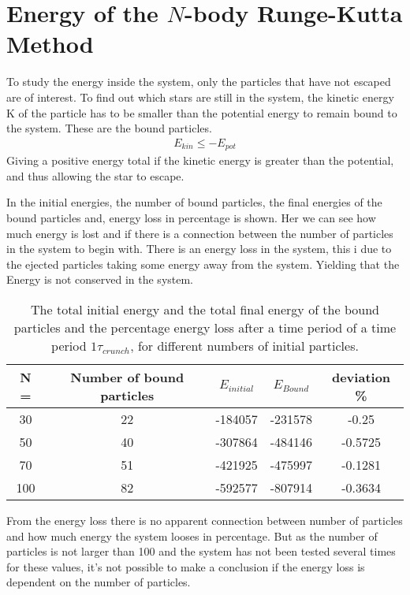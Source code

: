 \section{Energy of the $N$-body Runge-Kutta Method}
\label{sec:EnergyRK4}


To study the energy inside the system, only the particles that have not escaped are of interest. To find out which stars are still in the system, the kinetic energy K of the particle has to be smaller than the potential energy to remain bound to the system. These are the bound particles.   
\begin{align}
  E_{kin} \leqslant -E_{pot}
\end{align}
Giving a positive energy total if the kinetic energy is greater than the potential, and thus allowing the star to escape.

In  the initial energies, the number of bound particles, the final energies of the bound particles and, energy loss in percentage is shown. Her we can see how much energy is lost and if there is a connection between the number of particles in the system to begin with. There is an energy loss in the system, this i due to the ejected particles taking some energy away from the system. Yielding that the Energy is not conserved in the system. 
\begin{table}[H]
\centering
\begin{tabular}{|c|c|c|c|c|}
\hline
N = & Number of bound particles& $E_{initial}$ & $E_{Bound}$ & deviation \% \\
\hline
30  &  22 & -184057 & -231578  & -0.25 \\
50  & 40 & -307864 & -484146 & -0.5725 \\
70  & 51 & -421925 & -475997 & -0.1281 \\
100 & 82 & -592577 & -807914 & -0.3634 \\
\hline
\end{tabular}
\caption{The total initial energy and the total final energy of the bound particles and the percentage energy loss after a time period of a time period $1\tau_{crunch}$, for different numbers of initial particles. }
\label{tab:NpRK4}
\end{table}
From the energy loss there is no apparent connection between number of particles and how much energy the system looses in percentage. But as the number of particles is not larger than 100 and the system has not been tested several times for these values, it's not possible to make a conclusion if the energy loss is dependent on the number of particles. 

